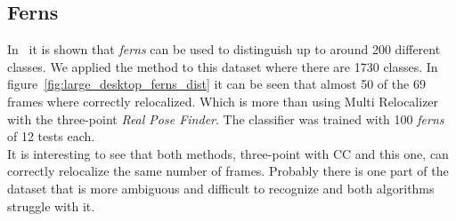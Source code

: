 \subsection{Ferns}
\label{sub:large_ferns}

In~\cite{Ozuysal2010} it is shown that \textit{ferns} can be used to distinguish up to around 200 different classes. We applied the method to this dataset where there are 1730 classes. In figure~\ref{fig:large_desktop_ferns_dist} it can be seen that almost 50 of the 69 frames where correctly relocalized. Which is more than using Multi Relocalizer with the three-point \textit{Real Pose Finder}. The classifier was trained with 100 \textit{ferns} of 12 tests each.\\

It is interesting to see that both methods, three-point with CC and this one, can correctly relocalize the same number of frames. Probably there is one part of the dataset that is more ambiguous and difficult to recognize and both algorithms struggle with it.\\


